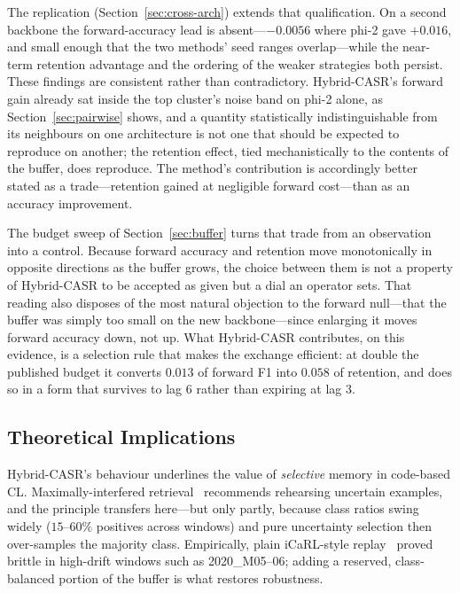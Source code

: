 \documentclass[a4paper,twoside]{article}
\begin{document}
The replication (Section~\ref{sec:cross-arch}) extends that qualification. On a second backbone the forward-accuracy lead is absent---$-0.0056$ where phi-2 gave $+0.016$, and small enough that the two methods' seed ranges overlap---while the near-term retention advantage and the ordering of the weaker strategies both persist. These findings are consistent rather than contradictory. Hybrid-CASR's forward gain already sat inside the top cluster's noise band on phi-2 alone, as Section~\ref{sec:pairwise} shows, and a quantity statistically indistinguishable from its neighbours on one architecture is not one that should be expected to reproduce on another; the retention effect, tied mechanistically to the contents of the buffer, does reproduce. The method's contribution is accordingly better stated as a trade---retention gained at negligible forward cost---than as an accuracy improvement.

The budget sweep of Section~\ref{sec:buffer} turns that trade from an observation into a control. Because forward accuracy and retention move monotonically in opposite directions as the buffer grows, the choice between them is not a property of Hybrid-CASR to be accepted as given but a dial an operator sets. That reading also disposes of the most natural objection to the forward null---that the buffer was simply too small on the new backbone---since enlarging it moves forward accuracy down, not up. What Hybrid-CASR contributes, on this evidence, is a selection rule that makes the exchange efficient: at double the published budget it converts $0.013$ of forward F1 into $0.058$ of retention, and does so in a form that survives to lag 6 rather than expiring at lag 3.

\subsection{Theoretical Implications}
\label{sec:disc-theory}

\noindent
Hybrid-CASR's behaviour underlines the value of \emph{selective} memory in code-based CL. Maximally-interfered retrieval~\citep{Aljundi2019MIR} recommends rehearsing uncertain examples, and the principle transfers here---but only partly, because class ratios swing widely ($15$--$60\%$ positives across windows) and pure uncertainty selection then over-samples the majority class. Empirically, plain iCaRL-style replay~\citep{Rebuffi2017iCaRL} proved brittle in high-drift windows such as 2020\_M05--06; adding a reserved, class-balanced portion of the buffer is what restores robustness.
\end{document}
